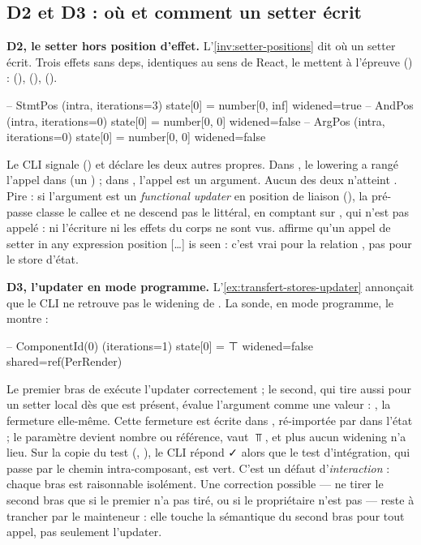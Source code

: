 \subsection{D2 et D3 : où et comment un setter écrit}

\textbf{D2, le setter hors position d'effet.} L'\cref{inv:setter-positions}
dit où un setter écrit. Trois effets sans deps, identiques au sens de React,
le mettent à l'épreuve () :
 (), 
(),  ().

\begin{sortie}
-- StmtPos (intra, iterations=3)
   state[0] = number[0, inf]   widened=true
-- AndPos (intra, iterations=0)
   state[0] = number[0, 0]   widened=false
-- ArgPos (intra, iterations=0)
   state[0] = number[0, 0]   widened=false
\end{sortie}

Le CLI signale  () et déclare les deux
autres propres. Dans , le lowering a rangé l'appel dans
 (un ) ; dans ,
l'appel est un argument. Aucun des deux n'atteint .
Pire : si l'argument est un \emph{functional updater} en position de
liaison (), la pré-passe classe le callee
 et ne descend pas le littéral, en comptant sur
, qui n'est pas appelé : ni l'écriture ni les effets
du corps ne sont vus.  affirme qu'un appel de
setter \og in any expression position [\ldots] is seen\fg{} : c'est vrai pour
la relation , pas pour le store d'état.

\textbf{D3, l'updater en mode programme.} L'\cref{ex:transfert-stores-updater}
annonçait que le CLI ne retrouve pas le widening de .
La sonde, en mode programme, le montre :
\begin{sortie}
-- ComponentId(0) (iterations=1)
   state[0] = ⊤   widened=false   shared=ref(PerRender)
\end{sortie}
Le premier bras de  exécute l'updater correctement ;
le second, qui tire aussi pour un setter local dès que  est
présent, évalue l'argument  comme une valeur :
, la fermeture elle-même. Cette fermeture est écrite
dans , ré-importée par  dans
l'état ; le paramètre  devient \og nombre ou référence\fg{},
 vaut $\Top$, et plus aucun widening n'a lieu. Sur la copie du test
(, ),
le CLI répond ✓  alors que le test
d'intégration, qui passe par le chemin intra-composant, est vert. C'est un
défaut d'\emph{interaction} : chaque bras est raisonnable isolément. Une
correction possible — ne tirer le second bras que si le premier n'a pas
tiré, ou si le propriétaire n'est pas  — reste à
trancher par le mainteneur : elle touche la sémantique du second bras pour
tout appel, pas seulement l'updater.

